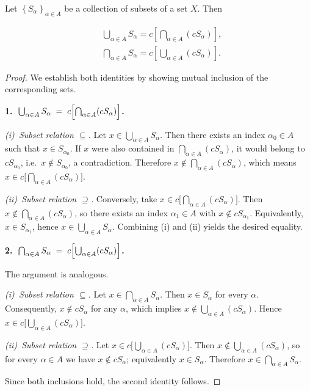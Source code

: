 \documentclass[10pt]{extarticle}
\begin{document}
\begin{lemma}[3.1]
    Let $\left\{S_\alpha\right\}_{\alpha \in A}$ be a collection of subsets of a set $X$. Then

    \begin{equation*}
        \begin{aligned}
             & \bigcup_{\alpha \in A} S_\alpha=c\left[\bigcap_{\alpha \in A}\left(c S_\alpha\right)\right],  \\
             & \bigcap_{\alpha \in A} S_\alpha=c\left[\bigcup_{\alpha \in A}\left(c S_\alpha\right)\right] .
        \end{aligned}
    \end{equation*}

\end{lemma}
\begin{proof}
    We establish both identities by showing mutual inclusion of the corresponding sets.

    \medskip
    \textbf{1.~$\displaystyle \bigcup_{\alpha\in A} S_{\alpha} \;=\; c\Bigl[\bigcap_{\alpha\in A} (c S_{\alpha})\Bigr]$.}

    \emph{(i)~Subset relation $\subseteq$.}  Let $x \in \bigcup_{\alpha\in A} S_{\alpha}$.  Then there exists an index $\alpha_0 \in A$ such that $x \in S_{\alpha_0}$.  If $x$ were also contained in $\bigcap_{\alpha\in A} (c S_{\alpha})$, it would belong to $c S_{\alpha_0}$, i.e.~$x \notin S_{\alpha_0}$, a contradiction.  Therefore $x \notin \bigcap_{\alpha\in A} (c S_{\alpha})$, which means $x \in c\bigl[\bigcap_{\alpha\in A} (c S_{\alpha})\bigr]$.

    \emph{(ii)~Subset relation $\supseteq$.}  Conversely, take $x \in c\bigl[\bigcap_{\alpha\in A} (c S_{\alpha})\bigr]$.  Then $x \notin \bigcap_{\alpha\in A} (c S_{\alpha})$, so there exists an index $\alpha_1 \in A$ with $x \notin c S_{\alpha_1}$.  Equivalently, $x \in S_{\alpha_1}$, hence $x \in \bigcup_{\alpha\in A} S_{\alpha}$.  Combining (i) and (ii) yields the desired equality.

    \medskip
    \textbf{2.~$\displaystyle \bigcap_{\alpha\in A} S_{\alpha} \;=\; c\Bigl[\bigcup_{\alpha\in A} (c S_{\alpha})\Bigr]$.}

    The argument is analogous.

    \emph{(i)~Subset relation $\subseteq$.}  Let $x \in \bigcap_{\alpha\in A} S_{\alpha}$.  Then $x \in S_{\alpha}$ for every $\alpha$.  Consequently, $x \notin c S_{\alpha}$ for any $\alpha$, which implies $x \notin \bigcup_{\alpha\in A} (c S_{\alpha})$.  Hence $x \in c\bigl[\bigcup_{\alpha\in A} (c S_{\alpha})\bigr]$.

    \emph{(ii)~Subset relation $\supseteq$.}  Let $x \in c\bigl[\bigcup_{\alpha\in A} (c S_{\alpha})\bigr]$.  Then $x \notin \bigcup_{\alpha\in A} (c S_{\alpha})$, so for every $\alpha \in A$ we have $x \notin c S_{\alpha}$; equivalently $x \in S_{\alpha}$.  Therefore $x \in \bigcap_{\alpha\in A} S_{\alpha}$.

    Since both inclusions hold, the second identity follows.
\end{proof}
\end{document}
